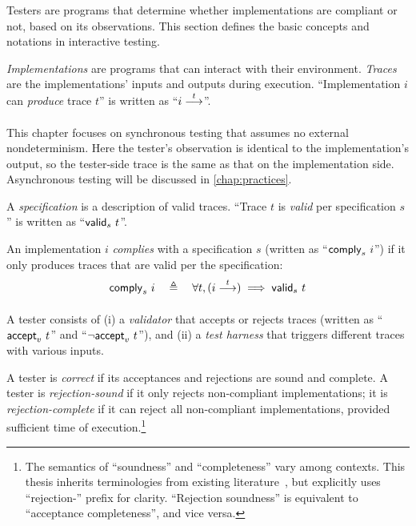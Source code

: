 Testers are programs that determine whether implementations are compliant or
not, based on its observations.  This section defines the basic concepts and
notations in interactive testing.

\begin{definition}
  {\em Implementations} are programs that can interact with their environment.
  {\em Traces} are the implementations' inputs and outputs during execution.
  ``Implementation $i$ can {\em produce} trace $t$'' is written as ``$\behaves i
  t$''.
\end{definition}

This chapter focuses on synchronous testing that assumes no external
nondeterminism.  Here the tester's observation is identical to the
implementation's output, so the tester-side trace is the same as that on the
implementation side.  Asynchronous testing will be discussed in
\autoref{chap:practices}.

\begin{definition}
  \label{def:compliance}
  A {\em specification} is a description of valid traces.  ``Trace $t$ is {\em
    valid} per specification $s$'' is written as ``$\mathsf{valid}_{s}~{t}$''.

  An implementation $i$ {\em complies} with a specification $s$ (written as
  ``$\mathsf{comply}_{s}~{i}$'') if it only produces traces that are valid per the
  specification:
  \[\complies s i\quad\triangleq\quad\forall t,(\behaves i t)\implies\valid s t\]
\end{definition}

\begin{definition}
  \label{def:tester}
  A tester consists of (i) a {\em validator} that accepts or rejects
  traces (written as ``$\mathsf{accept}_{v}~{t}$'' and ``$\neg\mathsf{accept}_{v}~{t}$''), and
  (ii) a {\em test harness} that triggers different traces with
  various inputs.

  A tester is {\em correct} if its acceptances and rejections are sound and
  complete.  A tester is {\em rejection-sound} if it only rejects non-compliant
  implementations; it is {\em rejection-complete} if it can reject all
  non-compliant implementations, provided sufficient time of
  execution.\footnote{The semantics of ``soundness'' and ``completeness'' vary
    among contexts.  This thesis inherits terminologies from existing
    literature~\cite{Tretmans}, but explicitly uses ``rejection-'' prefix for
    clarity.  ``Rejection soundness'' is equivalent to ``acceptance
    completeness'', and vice versa.}
\end{definition}

